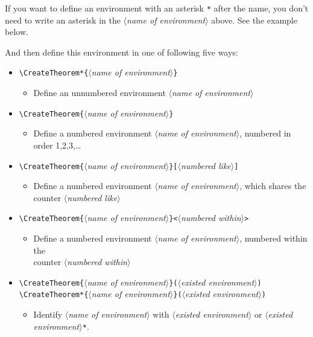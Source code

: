 \documentclass{minimart}
\providecommand{\meta}[1]{$\langle${\normalfont\itshape#1}$\rangle$}
\newenvironment{remind}[1][Remind]{%
    \LocallyStopLineNumbers%
    \begin{tcolorbox}[breakable,
        enhanced,
        width = \textwidth,
        colback = white, colbacktitle = paper,
        colframe = gray!50, boxrule=0.2mm,
        coltitle = black,
        fonttitle = \sffamily,
        attach boxed title to top left = {yshift=-\tcboxedtitleheight/2,  xshift=\tcboxedtitlewidth/4},
        boxed title style = {boxrule=0pt, colframe=paper},
        before skip = 0.3cm,
        after skip = 0.3cm,
        top = 3mm,
        bottom = 3mm,
        title={\sffamily #1}]%
}{\end{tcolorbox}\ResumeLineNumbers}
\begin{document}
\vspace{-.5\baselineskip}
\begin{remind}
    If you want to define an environment with an asterisk \lstinline|*| after the name, you don't need to write an asterisk in the \meta{name of environment} above. See the example below.
\end{remind}

And then define this environment in one of following five ways:
\begin{itemize}
    \item \lstinline|\CreateTheorem*{|\meta{name of environment}\lstinline|}|
        \begin{itemize}
            \item Define an unnumbered environment \meta{name of environment}
        \end{itemize}
    \item \lstinline|\CreateTheorem{|\meta{name of environment}\lstinline|}|
        \begin{itemize}
            \item Define a numbered environment \meta{name of environment}, numbered in order 1,2,3,\dots
        \end{itemize}
    \item \lstinline|\CreateTheorem{|\meta{name of environment}\lstinline|}[|\meta{numbered like}\lstinline|]|
        \begin{itemize}
            \item Define a numbered environment \meta{name of environment}, which shares the counter \meta{numbered like}
        \end{itemize}
    \item \lstinline|\CreateTheorem{|\meta{name of environment}\lstinline|}<|\meta{numbered within}\lstinline|>|
        \begin{itemize}
            \item Define a numbered environment \meta{name of environment}, numbered within the \\counter \meta{numbered within}
        \end{itemize}
    \item \lstinline|\CreateTheorem{|\meta{name of environment}\lstinline|}(|\meta{existed environment}\lstinline|)|\\
    \lstinline|\CreateTheorem*{|\meta{name of environment}\lstinline|}(|\meta{existed environment}\lstinline|)|
        \begin{itemize}
            \item Identify \meta{name of environment} with \meta{existed environment} or \meta{existed environment}\lstinline|*|.

\end{itemize}
\end{itemize}
\end{document}
